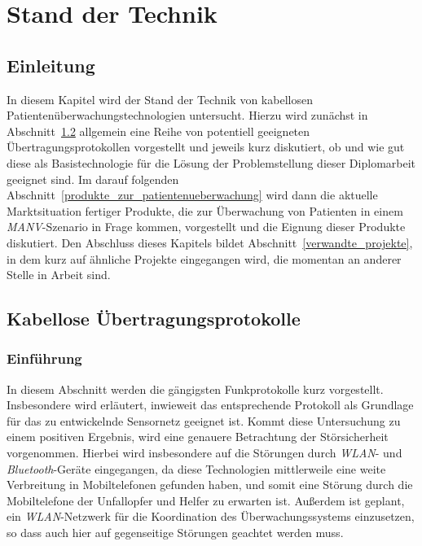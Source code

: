 
\chapter{Stand der Technik}\label{Stand der Technik}

\section{Einleitung}
In diesem Kapitel wird der Stand der Technik von kabellosen Patientenüberwachungstechnologien untersucht. 
Hierzu wird zunächst in Abschnitt~\ref{kabellose_uebertragungsprotokolle} allgemein eine Reihe von potentiell
geeigneten Übertragungsprotokollen vorgestellt und jeweils kurz diskutiert, ob und wie gut diese als 
Basistechnologie für die Lösung der Problemstellung dieser Diplomarbeit geeignet sind. Im darauf folgenden
Abschnitt~\ref{produkte_zur_patientenueberwachung} wird dann die aktuelle Marktsituation fertiger Produkte,
die zur Überwachung von Patienten in einem \emph{MANV}-Szenario in Frage kommen, vorgestellt und die Eignung dieser
Produkte diskutiert. Den Abschluss dieses Kapitels bildet Abschnitt~\ref{verwandte_projekte}, in dem
kurz auf ähnliche Projekte eingegangen wird, die momentan an anderer Stelle in Arbeit sind.

\section{Kabellose Übertragungsprotokolle}\label{kabellose_uebertragungsprotokolle}
    \subsection{Einführung}
        In diesem Abschnitt werden die gängigsten Funkprotokolle kurz vorgestellt. Insbesondere wird erläutert,
        inwieweit das entsprechende Protokoll als Grundlage für das zu entwickelnde Sensornetz geeignet ist.
        Kommt diese Untersuchung zu einem positiven Ergebnis, wird eine genauere Betrachtung der Störsicherheit
        vorgenommen. Hierbei wird insbesondere auf die Störungen durch \emph{WLAN}- und \emph{Bluetooth}-Geräte
        eingegangen, da diese Technologien mittlerweile eine weite Verbreitung in Mobiltelefonen gefunden
        haben, und somit eine Störung durch die Mobiltelefone der Unfallopfer und Helfer zu erwarten ist. Außerdem
        ist geplant, ein \emph{WLAN}-Netzwerk für die Koordination des Überwachungssystems einzusetzen, so dass
        auch hier auf gegenseitige Störungen geachtet werden muss.


